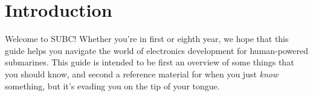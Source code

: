 \chapter{Introduction}
Welcome to SUBC! Whether you're in first or eighth year, we hope that this guide helps you navigate the world of electronics development for human-powered submarines. This guide is intended to be first an overview of some things that you should know, and second a reference material for when you just \emph{know} something, but it's evading you on the tip of your tongue.